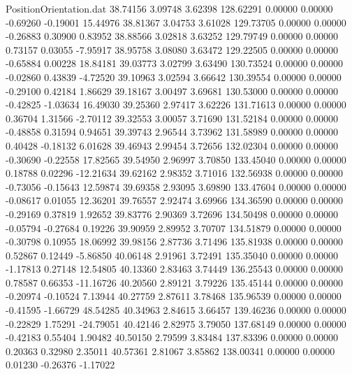 \begin{filecontents}{PositionOrientation.dat}
  38.74156    3.09748    3.62398   128.62291    0.00000    0.00000   -0.69260   -0.19001   15.44976
  38.81367    3.04753    3.61028   129.73705    0.00000    0.00000   -0.26883    0.30900    0.83952
  38.88566    3.02818    3.63252   129.79749    0.00000    0.00000    0.73157    0.03055   -7.95917
  38.95758    3.08080    3.63472   129.22505    0.00000    0.00000   -0.65884    0.00228   18.84181
  39.03773    3.02799    3.63490   130.73524    0.00000    0.00000   -0.02860    0.43839   -4.72520
  39.10963    3.02594    3.66642   130.39554    0.00000    0.00000   -0.29100    0.42184    1.86629
  39.18167    3.00497    3.69681   130.53000    0.00000    0.00000   -0.42825   -1.03634   16.49030
  39.25360    2.97417    3.62226   131.71613    0.00000    0.00000    0.36704    1.31566   -2.70112
  39.32553    3.00057    3.71690   131.52184    0.00000    0.00000   -0.48858    0.31594    0.94651
  39.39743    2.96544    3.73962   131.58989    0.00000    0.00000    0.40428   -0.18132    6.01628
  39.46943    2.99454    3.72656   132.02304    0.00000    0.00000   -0.30690   -0.22558   17.82565
  39.54950    2.96997    3.70850   133.45040    0.00000    0.00000    0.18788    0.02296  -12.21634
  39.62162    2.98352    3.71016   132.56938    0.00000    0.00000   -0.73056   -0.15643   12.59874
  39.69358    2.93095    3.69890   133.47604    0.00000    0.00000   -0.08617    0.01055   12.36201
  39.76557    2.92474    3.69966   134.36590    0.00000    0.00000   -0.29169    0.37819    1.92652
  39.83776    2.90369    3.72696   134.50498    0.00000    0.00000   -0.05794   -0.27684    0.19226
  39.90959    2.89952    3.70707   134.51879    0.00000    0.00000   -0.30798    0.10955   18.06992
  39.98156    2.87736    3.71496   135.81938    0.00000    0.00000    0.52867    0.12449   -5.86850
  40.06148    2.91961    3.72491   135.35040    0.00000    0.00000   -1.17813    0.27148   12.54805
  40.13360    2.83463    3.74449   136.25543    0.00000    0.00000    0.78587    0.66353  -11.16726
  40.20560    2.89121    3.79226   135.45144    0.00000    0.00000   -0.20974   -0.10524    7.13944
  40.27759    2.87611    3.78468   135.96539    0.00000    0.00000   -0.41595   -1.66729   48.54285
  40.34963    2.84615    3.66457   139.46236    0.00000    0.00000   -0.22829    1.75291  -24.79051
  40.42146    2.82975    3.79050   137.68149    0.00000    0.00000   -0.42183    0.55404    1.90482
  40.50150    2.79599    3.83484   137.83396    0.00000    0.00000    0.20363    0.32980    2.35011
  40.57361    2.81067    3.85862   138.00341    0.00000    0.00000    0.01230   -0.26376   -1.17022

\end{filecontents}
